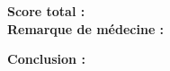 \textbf{Score total :} \dotfill \\


\textbf{Remarque de médecine :} \\
\Pointilles[4]

\textbf{Conclusion :} \dotfill \\

